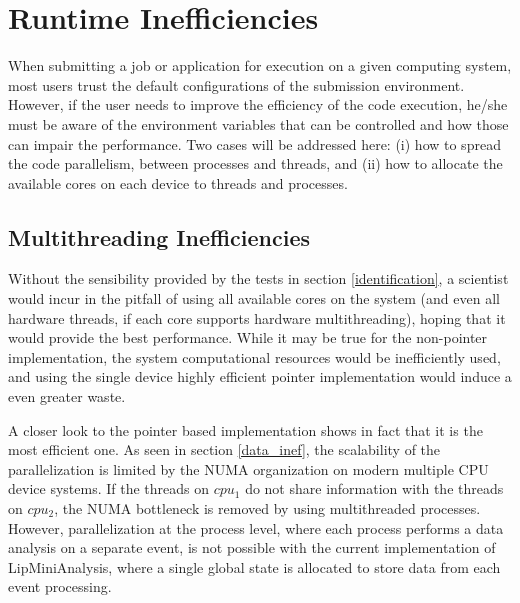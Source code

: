 \section{Runtime Inefficiencies}
\label{removal}

When submitting a job or application for execution on a given computing system, most users trust the default configurations of the submission environment. However, if the user needs to improve the efficiency of the code execution, he/she must be aware of the environment variables that can be controlled and how those can impair the performance. Two cases will be addressed here: (i) how to spread the code parallelism, between processes and threads, and (ii) how to allocate the available cores on each device to threads and processes.

\subsection{Multithreading Inefficiencies}

Without the sensibility provided by the tests in section \ref{identification}, a scientist would incur in the pitfall of using all available cores on the system (and even all hardware threads, if each core supports hardware multithreading), hoping that it would provide the best performance. While it may be true for the non-pointer implementation, the system computational resources would be inefficiently used, and using the single device highly efficient pointer implementation would induce a even greater waste.

A closer look to the pointer based implementation shows in fact that it is the most efficient one. As seen in section \ref{data_inef}, the scalability of the parallelization is limited by the NUMA organization on modern multiple CPU device systems. If the threads on $cpu_1$ do not share information with the threads on $cpu_2$, the NUMA bottleneck is removed by using multithreaded processes. However, parallelization at the process level, where each process performs a data analysis on a separate event, is not possible with the current implementation of LipMiniAnalysis, where a single global state is allocated to store data from each event processing.

